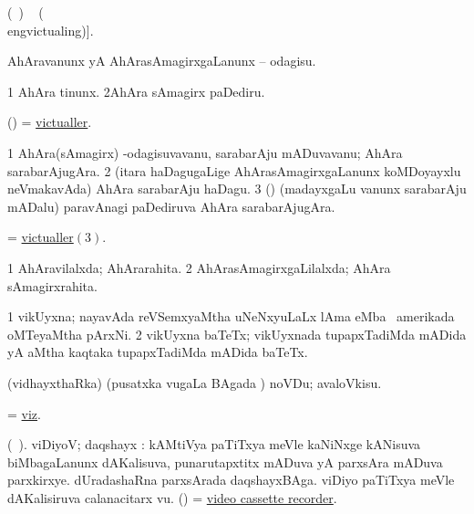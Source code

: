 \bentry
{} 
\gl{\kirx}
\expl{[\BU\ matutx \BUkaq\ \eng{victualled} }
(\ame\ )\eng{;} \vakaq\  (\ame\\eng{victualing})]. 

\noindent
\gl{\sakirx}
\bmng
AhAravanunx yA AhArasAmagirxgaLanunx -- odagisu. 
\emng

\noindent 
\gl{\akirx}
\expl{}
\bmng
\bnum
\num{1} AhAra tinunx. 
\num{2}AhAra sAmagirx paDediru. 
\enum
\emng
\eentry

\bentry
{} 
\gl{\nA}
\expl{}
\bmng
 (\ame) = \hyperlink{victualler}{victualler}. 
\emng
\eentry

\bentry
{} 
\gl{\nA}
\expl{}
\bmng
\bnum
\num{1} AhAra(sAmagirx) -odagisuvavanu, sarabarAju mADuvavanu; AhAra sarabarAjugAra. 
\num{2} (itara haDagugaLige AhArasAmagirxgaLanunx koMDoyayxlu neVmakavAda) AhAra sarabarAju haDagu. 
\hypertarget{victualler(3)}{} 
\num{3} (\birx) (madayxgaLu \mo vanunx sarabarAju mADalu) paravAnagi paDediruva AhAra sarabarAjugAra. 
\enum
\emng

\noindent 
\gl{\pagu}
\expl{}
\bmng
  = \hyperlink{victualler(3)}{victualler\((3)\)}. 
\emng
\eentry

\bentry
{}
\gl{\gu}
\bmng
\bnum
\num{1} AhAravilalxda; AhArarahita. 
\num{2} AhArasAmagirxgaLilalxda; AhAra sAmagirxrahita. 
\enum
\emng
\eentry

\bentry
{} 
\gl{\nA}
\bmng
\bnum
\num{1} vikUyxna; nayavAda reVSemxyaMtha uNeNxyuLaLx lAma eMba \da\ amerikada oMTeyaMtha pArxNi.  
\num{2} vikUyxna baTeTx; vikUyxnada tupapxTadiMda mADida yA aMtha kaqtaka tupapxTadiMda mADida baTeTx. 
\enum
\emng
\eentry

\bentry 
{} 
\gl{\sakirx}
\expl{\Latin }
\bmng
 (vidhayxthaRka) (pusatxka \mo vugaLa BAgada \vi) noVDu; avaloVkisu. 
\emng
\eentry

\bentry
{} 
\gl{\kirxvi}
\expl{}
\bmng
 = \hyperlink{viz}{viz}. 
\emng
\eentry

\bentry
{} 
\gl{\nA}(\bava\ ). 
\bmng
 viDiyoV; daqshayx : 
\banum
{} kAMtiVya paTiTxya meVle kaNiNxge kANisuva biMbagaLanunx dAKalisuva, punarutapxtitx mADuva yA parxsAra mADuva parxkirxye. 
 dUradashaRna parxsArada daqshayxBAga. 
 viDiyo paTiTxya meVle dAKalisiruva calanacitarx \mo vu. 
 (\AmA) = \hyperlink{video cassette recorder}{video cassette recorder}. 
\eanum
\emng
\eentry

